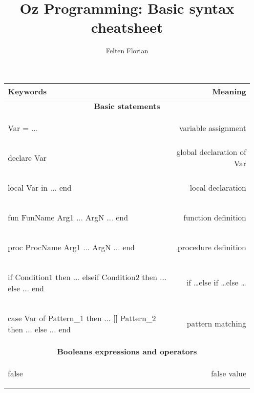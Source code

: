 \documentclass[12pt]{article}
\title{Oz Programming: Basic syntax cheatsheet}
\author{Felten Florian}
\begin{document}
\maketitle

\begin{longtable}{l r}
\toprule[0.2em]
\multicolumn{1}{l}{\textbf{Keywords}} & \textbf{Meaning}\\
\midrule


\multicolumn{2}{c}{\textbf{Basic statements}}\\

\begin{oz}
Var = ...
\end{oz}
&variable assignment\\

\begin{oz}
declare Var 
\end{oz}
&global declaration of Var\\
 
\begin{oz}
local Var in 
	...
end
\end{oz}
&local declaration\\
 
 
\begin{oz}
fun {FunName Arg1 ... ArgN}
	...
end
\end{oz}
&function definition\\
 
\begin{oz}
proc {ProcName Arg1 ... ArgN}
	...
end
\end{oz}
&procedure definition\\

\begin{oz}
if Condition1 then
	...
elseif Condition2 then 
	...
else
	...
end
\end{oz}
&if \dots else if \dots else \dots \\
 
 
\begin{oz}
case Var of Pattern_1 then ...
[] Pattern_2 then ...
else ...
end
\end{oz}
&pattern matching \\[0.4em]



\multicolumn{2}{c}{\textbf{Booleans expressions and operators}}\\
\begin{oz}
false 
\end{oz}
&false value\\
 

\end{longtable}
\end{document}

